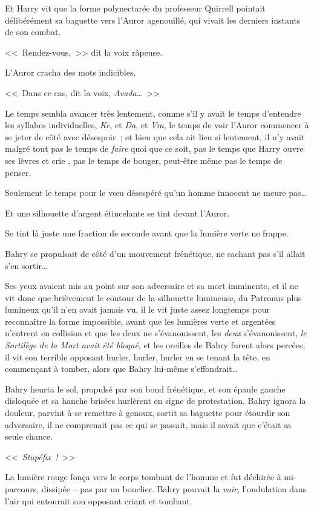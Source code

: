Et Harry vit que la forme polynectarée du professeur Quirrell pointait délibérément sa baguette vers l'Auror agenouillé, qui vivait les derniers instants de son combat.

<<~Rendez-vous,~>> dit la voix râpeuse.

L'Auror cracha des mots indicibles.

<<~Dans ce cas, dit la voix, \emph{Avada…}~>>

Le temps sembla avancer très lentement, comme s'il y avait le temps d'entendre les syllabes individuelles, \emph{Ke}, et \emph{Da}, et \emph{Vra}, le temps de voir l'Auror commencer à se jeter de côté avec désespoir~; et bien que cela ait lieu si lentement, il n'y avait malgré tout pas le temps de \emph{faire} quoi que ce soit, pas le temps que Harry ouvre ses lèvres et crie , pas le temps de bouger, peut-être même pas le temps de penser.

Seulement le temps pour le vœu désespéré qu'un homme innocent ne meure pas…

Et une silhouette d'argent étincelante se tint devant l'Auror.

Se tint là juste une fraction de seconde avant que la lumière verte ne frappe.

\later

Bahry se propulsait de côté d'un mouvement frénétique, ne sachant pas s'il allait s'en sortir…

Ses yeux avaient mis au point sur son adversaire et sa mort imminente, et il ne vit donc que brièvement le contour de la silhouette lumineuse, du Patronus plus lumineux qu'il n'en avait jamais vu, il le vit juste assez longtemps pour reconnaître la forme impossible, avant que les lumières verte et argentées n'entrent en collision et que les deux ne s'évanouissent, les \emph{deux} s'évanouissent, \emph{le Sortilège de la Mort avait été bloqué}, et les oreilles de Bahry furent alors percées, il vit son terrible opposant hurler, hurler, hurler en se tenant la tête, en commençant à tomber, alors que Bahry lui-même s'effondrait…

Bahry heurta le sol, propulsé par son bond frénétique, et son épaule gauche disloquée et sa hanche brisées hurlèrent en signe de protestation. Bahry ignora la douleur, parvint à se remettre à genoux, sortit sa baguette pour étourdir son adversaire, il ne comprenait pas ce qui se passait, mais il savait que c'était sa seule chance.

<<~\emph{Stupéfix~!}~>>

La lumière rouge fonça vers le corps tombant de l'homme et fut déchirée à mi-parcours, dissipée -- pas par un bouclier. Bahry pouvait la \emph{voir}, l'ondulation dans l'air qui entourait son opposant criant et tombant.

